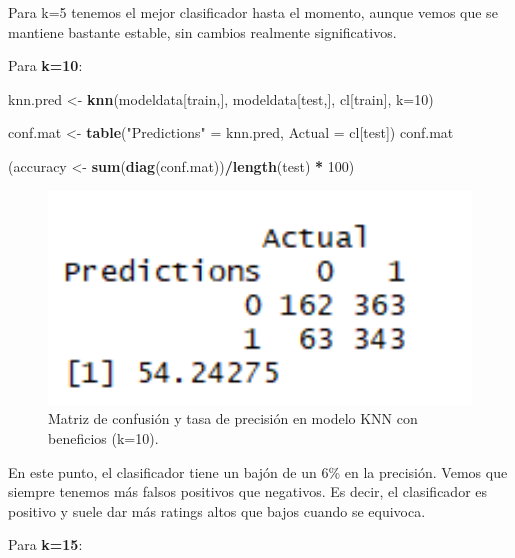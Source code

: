 \documentclass[spanish,]{article}
\newenvironment{Shaded}{\begin{snugshade}}{\end{snugshade}}
\newcommand{\KeywordTok}[1]{\textcolor[rgb]{0.13,0.29,0.53}{\textbf{#1}}}
\newcommand{\DataTypeTok}[1]{\textcolor[rgb]{0.13,0.29,0.53}{#1}}
\newcommand{\DecValTok}[1]{\textcolor[rgb]{0.00,0.00,0.81}{#1}}
\newcommand{\StringTok}[1]{\textcolor[rgb]{0.31,0.60,0.02}{#1}}
\newcommand{\OperatorTok}[1]{\textcolor[rgb]{0.81,0.36,0.00}{\textbf{#1}}}
\newcommand{\NormalTok}[1]{#1}
\begin{document}
Para k=5 tenemos el mejor clasificador hasta el momento, aunque vemos
que se mantiene bastante estable, sin cambios realmente significativos.

Para \textbf{k=10}:

\begin{Shaded}
\begin{Highlighting}[]
\NormalTok{knn.pred <-}\StringTok{ }\KeywordTok{knn}\NormalTok{(modeldata[train,], modeldata[test,], cl[train], }\DataTypeTok{k=}\DecValTok{10}\NormalTok{) }

\NormalTok{conf.mat <-}\StringTok{ }\KeywordTok{table}\NormalTok{(}\StringTok{"Predictions"}\NormalTok{ =}\StringTok{ }\NormalTok{knn.pred, }\DataTypeTok{Actual =}\NormalTok{ cl[test])}
\NormalTok{conf.mat}

\NormalTok{(accuracy <-}\StringTok{ }\KeywordTok{sum}\NormalTok{(}\KeywordTok{diag}\NormalTok{(conf.mat))}\OperatorTok{/}\KeywordTok{length}\NormalTok{(test) }\OperatorTok{*}\StringTok{ }\DecValTok{100}\NormalTok{)}
\end{Highlighting}
\end{Shaded}

\begin{figure}[h]
    \centering
    \includegraphics[width=1\textwidth]{figuras/KNN/benefits_k10.png}
    \caption{Matriz de confusión y tasa de precisión en modelo KNN con beneficios (k=10).}
    \label{fig:KNN:benefitsK10}
\end{figure}

En este punto, el clasificador tiene un bajón de un 6\% en la precisión.
Vemos que siempre tenemos más falsos positivos que negativos. Es decir,
el clasificador es positivo y suele dar más ratings altos que bajos
cuando se equivoca.

Para \textbf{k=15}:
\end{document}

